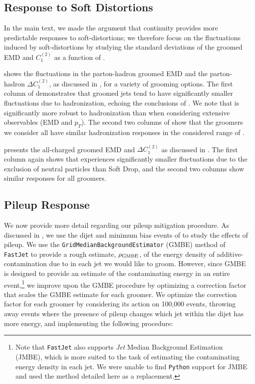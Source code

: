\begin{subappendices}
\subsection{Response to Soft Distortions}
In the main text, we made the argument that continuity provides more predictable responses to \glspl{soft-distortion};
%
we therefore focus on the fluctuations induced by \glspl{soft-distortion} by studying the standard deviations of the groomed EMD and \(C_1^{(2)}\) as a function of \zcut.

 shows the fluctuations in the parton-hadron groomed EMD and the parton-hadron \(\Delta C_1^{(2)}\), as discussed in , for a variety of grooming options.
%
The first column of  demonstrates that  groomed jets tend to have significantly smaller fluctuations due to \gls{hadronization}, echoing the conclusions of .
%
We note that  is significantly more robust to \gls{hadronization} than  when considering extensive observables (EMD and \(p_T\)).
%
The second two columns of  show that the \PIRANHA{} groomers we consider all have similar \gls{hadronization} responses in the considered range of \zcut.

 presents the all-charged groomed EMD and \(\Delta C_1^{(2)}\) as discussed in .
%
The first column again shows that  experiences significantly smaller fluctuations due to the exclusion of neutral particles than Soft Drop, and the second two columns show similar responses for all \PIRANHA{} groomers.


\subsection{Pileup Response}
\label{app:pufrenzy}

We now provide more detail regarding our \gls{pileup} mitigation procedure.
%
As discussed in , we use the dijet and minimum bias events of  to study the effects of \gls{pileup}.
%
We use the \texttt{GridMedianBackgroundEstimator} (GMBE) method of \texttt{FastJet} \cite{Cacciari:2011ma} to provide a rough estimate, \(\rho_{\rm GMBE}\), of the energy density of \gls{additive-contamination} due to  in each jet we would like to groom.
%
However, since GMBE is designed to provide an estimate of the contaminating energy in an entire event,\footnote{
Note that \texttt{FastJet} also supports \textit{Jet} Median Background Estimation (JMBE), which is more suited to the task of estimating the contaminating energy density in each jet.
%
We were unable to find \texttt{Python} support for JMBE and used the method detailed here as a replacement.
} we improve upon the GMBE procedure by optimizing a correction factor that scales the GMBE estimate for each groomer.
%
We optimize the correction factor for each groomer by considering its action on 100,000 events, throwing away events where the presence of \gls{pileup} changes which jet within the dijet has more energy, and implementing the following procedure:


\end{subappendices}
